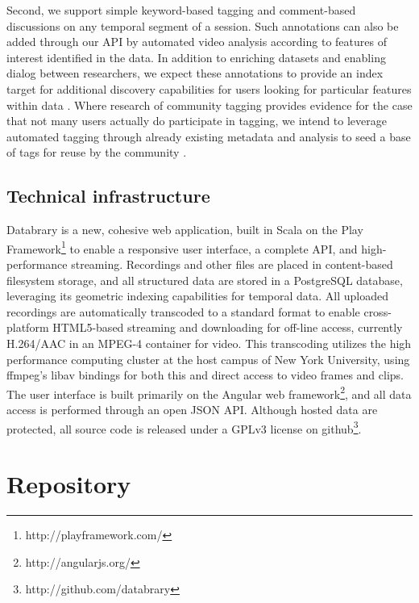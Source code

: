 \documentclass{sig-alternate}
\begin{document}
Second, we support simple keyword-based tagging and comment-based discussions on any temporal segment of a session.
Such annotations can also be added through our API by automated video analysis according to features of interest identified in the data.
In addition to enriching datasets and enabling dialog between researchers, we expect these annotations to provide an index target for additional discovery capabilities for users looking for particular features within data \cite{Lanagan_Smeaton_2012}.
Where research of community tagging provides evidence for the case that not many users actually do participate in tagging, we intend to leverage automated tagging through already existing metadata and analysis to seed a base of tags for reuse by the community \cite{Yang_Lu_Giles_2011, Farooq_etal_2007}.

\subsection{Technical infrastructure}

Databrary is a new, cohesive web application, built in Scala on the Play Framework\footnote{http://playframework.com/} to enable a responsive user interface, a complete API, and high-performance streaming.
Recordings and other files are placed in content-based filesystem storage, and all structured data are stored in a PostgreSQL database, leveraging its geometric indexing capabilities for temporal data.
All uploaded recordings are automatically transcoded to a standard format to enable cross-platform HTML5-based streaming and downloading for off-line access, currently H.264/AAC in an MPEG-4 container for video.
This transcoding utilizes the high performance computing cluster at the host campus of New York University, using ffmpeg's libav bindings for both this and direct access to video frames and clips.
The user interface is built primarily on the Angular web framework\footnote{http://angularjs.org/}, and all data access is performed through an open JSON API.
Although hosted data are protected, all source code is released under a GPLv3 license on github\footnote{http://github.com/databrary}.

\section{Repository}
\end{document}
